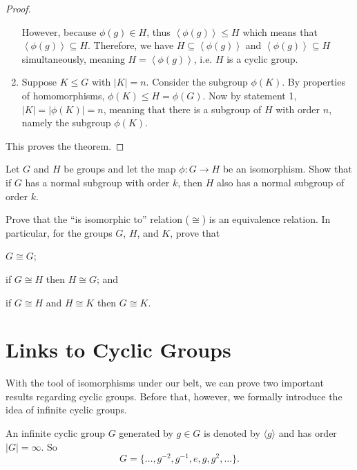 \begin{proof}
\begin{enumerate}
        However, because $\phi(g) \in H$, thus $\left\langle \phi(g) \right\rangle \leq H$ which means that $\left\langle \phi(g) \right\rangle \subseteq H$. Therefore, we have $H \subseteq \left\langle \phi(g) \right\rangle$ and $\left\langle \phi(g) \right\rangle \subseteq H$ simultaneously, meaning $H = \left\langle \phi(g) \right\rangle$, i.e. $H$ is a cyclic group.

        \item Suppose $K \leq G$ with $|K| = n$. Consider the subgroup $\phi(K)$. By properties of homomorphisms, $\phi(K) \leq H = \phi(G)$. Now by statement 1, $|K| = |\phi(K)| = n$, meaning that there is a subgroup of $H$ with order $n$, namely the subgroup $\phi(K)$.
    \end{enumerate}

    This proves the theorem.
\end{proof}

\begin{exercise}
    Let $G$ and $H$ be groups and let the map $\phi: G \to H$ be an isomorphism. Show that if $G$ has a normal subgroup with order $k$, then $H$ also has a normal subgroup of order $k$.
\end{exercise}

\begin{exercise}
    Prove that the ``is isomorphic to'' relation ($\cong$) is an equivalence relation. In particular, for the groups $G$, $H$, and $K$, prove that
    \begin{partquestions}{\alph*}
        \item $G \cong G$;
        \item if $G \cong H$ then $H \cong G$; and
        \item if $G \cong H$ and $H \cong K$ then $G \cong K$.
    \end{partquestions}
\end{exercise}

\section{Links to Cyclic Groups}
With the tool of isomorphisms under our belt, we can prove two important results regarding cyclic groups. Before that, however, we formally introduce the idea of infinite cyclic groups.
\begin{definition}
    An infinite cyclic group $G$ generated by $g \in G$ is denoted by $\langle g \rangle$ and has order $|G| = \infty$. So
    \[
        G = \{\dots, g^{-2}, g^{-1}, e, g, g^2, \dots\}.
    \]
\end{definition}

